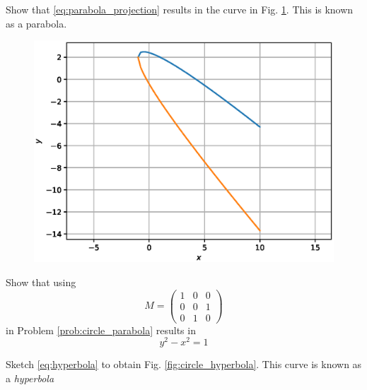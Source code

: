 \documentclass[journal,12pt,twocolumn]{IEEEtran}
\begin{document}
\begin{problem}
Show that \eqref{eq:parabola_projection} results in the curve in Fig. \ref{fig:parabola_projection}.  This is known as a parabola.
\end{problem}
\begin{figure}[!h]
\centering
\includegraphics[width=\columnwidth]{./figs/parabola_projection.eps}
\caption{}
\label{fig:parabola_projection}
\end{figure}
%
\begin{problem}
Show that using  
\begin{equation}
M = 
\begin{pmatrix}
1 & 0 & 0
\\
0 & 0 & 1
\\
0 & 1 & 0
\end{pmatrix}
\end{equation}
in Problem \ref{prob:circle_parabola} results in 
\begin{equation}
\label{eq:hyperbola}
y^2-x^2 = 1
\end{equation}
\end{problem}
\begin{problem}
Sketch \eqref{eq:hyperbola} to obtain Fig. \ref{fig:circle_hyperbola}.
This curve is known as a {\em hyperbola}
\end{problem}
\solution	

\end{document}
